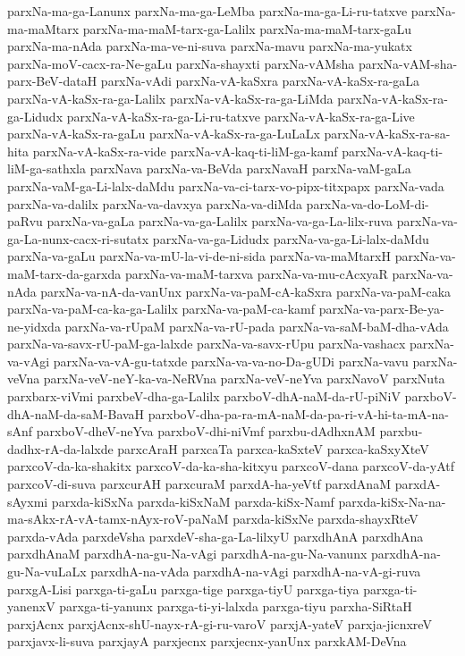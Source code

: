 {parxNa-ma-ga-Lanunx
parxNa-ma-ga-LeMba
parxNa-ma-ga-Li-ru-tatxve
parxNa-ma-maMtarx
parxNa-ma-maM-tarx-ga-Lalilx
parxNa-ma-maM-tarx-gaLu
parxNa-ma-nAda
parxNa-ma-ve-ni-suva
parxNa-mavu
parxNa-ma-yukatx
parxNa-moV-cacx-ra-Ne-gaLu
parxNa-shayxti
parxNa-vAMsha
parxNa-vAM-sha-parx-BeV-dataH
parxNa-vAdi
parxNa-vA-kaSxra
parxNa-vA-kaSx-ra-gaLa
parxNa-vA-kaSx-ra-ga-Lalilx
parxNa-vA-kaSx-ra-ga-LiMda
parxNa-vA-kaSx-ra-ga-Lidudx
parxNa-vA-kaSx-ra-ga-Li-ru-tatxve
parxNa-vA-kaSx-ra-ga-Live
parxNa-vA-kaSx-ra-gaLu
parxNa-vA-kaSx-ra-ga-LuLaLx
parxNa-vA-kaSx-ra-sa-hita
parxNa-vA-kaSx-ra-vide
parxNa-vA-kaq-ti-liM-ga-kamf
parxNa-vA-kaq-ti-liM-ga-sathxla
parxNava
parxNa-va-BeVda
parxNavaH
parxNa-vaM-gaLa
parxNa-vaM-ga-Li-lalx-daMdu
parxNa-va-ci-tarx-vo-pipx-titxpapx
parxNa-vada
parxNa-va-dalilx
parxNa-va-davxya
parxNa-va-diMda
parxNa-va-do-LoM-di-paRvu
parxNa-va-gaLa
parxNa-va-ga-Lalilx
parxNa-va-ga-La-lilx-ruva
parxNa-va-ga-La-nunx-cacx-ri-sutatx
parxNa-va-ga-Lidudx
parxNa-va-ga-Li-lalx-daMdu
parxNa-va-gaLu
parxNa-va-mU-la-vi-de-ni-sida
parxNa-va-maMtarxH
parxNa-va-maM-tarx-da-garxda
parxNa-va-maM-tarxva
parxNa-va-mu-cAcxyaR
parxNa-va-nAda
parxNa-va-nA-da-vanUnx
parxNa-va-paM-cA-kaSxra
parxNa-va-paM-caka
parxNa-va-paM-ca-ka-ga-Lalilx
parxNa-va-paM-ca-kamf
parxNa-va-parx-Be-ya-ne-yidxda
parxNa-va-rUpaM
parxNa-va-rU-pada
parxNa-va-saM-baM-dha-vAda
parxNa-va-savx-rU-paM-ga-lalxde
parxNa-va-savx-rUpu
parxNa-vashacx
parxNa-va-vAgi
parxNa-va-vA-gu-tatxde
parxNa-va-va-no-Da-gUDi
parxNa-vavu
parxNa-veVna
parxNa-veV-neY-ka-va-NeRVna
parxNa-veV-neYva
parxNavoV
parxNuta
parxbarx-viVmi
parxbeV-dha-ga-Lalilx
parxboV-dhA-naM-da-rU-piNiV
parxboV-dhA-naM-da-saM-BavaH
parxboV-dha-pa-ra-mA-naM-da-pa-ri-vA-hi-ta-mA-na-sAnf
parxboV-dheV-neYva
parxboV-dhi-niVmf
parxbu-dAdhxnAM
parxbu-dadhx-rA-da-lalxde
parxcAraH
parxcaTa
parxca-kaSxteV
parxca-kaSxyXteV
parxcoV-da-ka-shakitx
parxcoV-da-ka-sha-kitxyu
parxcoV-dana
parxcoV-da-yAtf
parxcoV-di-suva
parxcurAH
parxcuraM
parxdA-ha-yeVtf
parxdAnaM
parxdA-sAyxmi
parxda-kiSxNa
parxda-kiSxNaM
parxda-kiSx-Namf
parxda-kiSx-Na-na-ma-sAkx-rA-vA-tamx-nAyx-roV-paNaM
parxda-kiSxNe
parxda-shayxRteV
parxda-vAda
parxdeVsha
parxdeV-sha-ga-La-lilxyU
parxdhAnA
parxdhAna
parxdhAnaM
parxdhA-na-gu-Na-vAgi
parxdhA-na-gu-Na-vanunx
parxdhA-na-gu-Na-vuLaLx
parxdhA-na-vAda
parxdhA-na-vAgi
parxdhA-na-vA-gi-ruva
parxgA-Lisi
parxga-ti-gaLu
parxga-tige
parxga-tiyU
parxga-tiya
parxga-ti-yanenxV
parxga-ti-yanunx
parxga-ti-yi-lalxda
parxga-tiyu
parxha-SiRtaH
parxjAcnx
parxjAcnx-shU-nayx-rA-gi-ru-varoV
parxjA-yateV
parxja-jicnxreV
parxjavx-li-suva
parxjayA
parxjecnx
parxjecnx-yanUnx
parxkAM-DeVna
}
